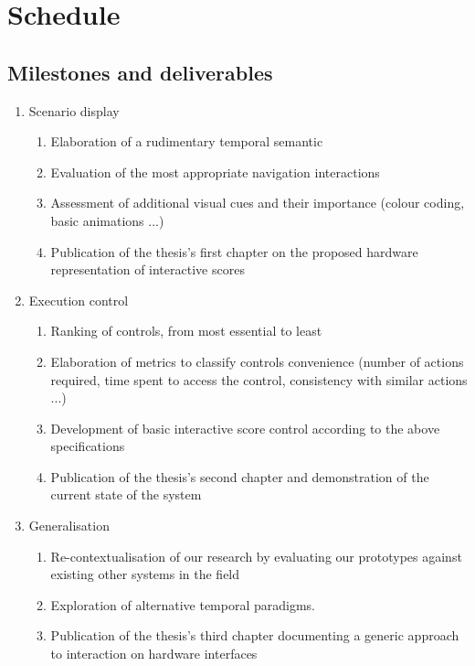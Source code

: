 \documentclass[journal,onecolumn]{IEEEtran}
\begin{document}
\newpage

\section{Schedule} %
\subsection{Milestones and deliverables}
\renewcommand{\theenumi}{M.\arabic{enumi}}
\renewcommand{\theenumii}{d.\arabic{enumi}.\arabic{enumii}}
\begin{enumerate}
    \item Scenario display
    \begin{enumerate}
        \item Elaboration of a rudimentary temporal semantic
        \item Evaluation of the most appropriate navigation interactions
        \item Assessment of additional visual cues and their importance (colour coding, basic animations ...)
        \item Publication of the thesis's first chapter on the proposed hardware representation of interactive scores
    \end{enumerate}
    \item Execution control
    \begin{enumerate}
        \item Ranking of controls, from most essential to least
        \item Elaboration of metrics to classify controls convenience (number of actions required, time spent to access the control, consistency with similar actions ...)
        \item Development of basic interactive score control according to the above specifications
        \item Publication of the thesis's second chapter and demonstration of the current state of the system
    \end{enumerate}
    \item Generalisation
    \begin{enumerate}
        \item Re-contextualisation of our research by evaluating our prototypes against existing other systems in the field
        \item Exploration of alternative temporal paradigms.
        \item Publication of the thesis's third chapter documenting a generic approach to interaction on hardware interfaces

\end{enumerate}
\end{enumerate}
\end{document}
